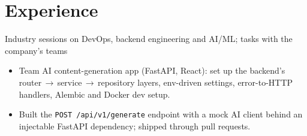 \section{Experience}
{Industry sessions on DevOps, backend engineering and AI/ML; tasks with the company's teams}
{\begin{itemize}
  \item Team AI content-generation app (FastAPI, React): set up the backend's router\,$\to$\,service\,$\to$\,repository layers, env-driven settings, error-to-HTTP handlers, Alembic and Docker dev setup.
  \item Built the \texttt{POST /api/v1/generate} endpoint with a mock AI client behind an injectable FastAPI dependency; shipped through pull requests.
\end{itemize}}
